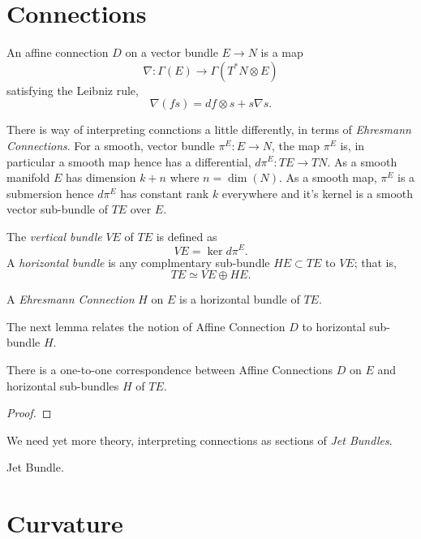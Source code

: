\documentclass{amsart}
\begin{document}
\section{Connections}

\begin{defn}
An affine connection \(D\) on a vector bundle \(E \to N\) is a map
\[
\nabla : \Gamma(E) \to \Gamma(T^{\ast} N \otimes E)
\]
satisfying the Leibniz rule,
\[
\nabla (f s) = df \otimes s + s \nabla s.
\]
\end{defn}

There is way of interpreting connctions a little differently, in terms of \emph{Ehresmann Connections}. For a smooth, vector bundle \(\pi^E : E \to N\), the map \(\pi^E\) is, in particular a smooth map hence has a differential, \(d\pi^E : TE \to TN\). As a smooth manifold \(E\) has dimension \(k+n\) where \(n = \operatorname{dim} (N)\). As a smooth map, \(\pi^E\) is a submersion hence \(d\pi^E\) has constant rank \(k\) everywhere and it's kernel is a smooth vector sub-bundle of \(TE\) over \(E\).

\begin{defn}
The \emph{vertical bundle} \(VE\) of \(TE\) is defined as
\[
VE = \operatorname{ker} d\pi^E.
\]
A \emph{horizontal bundle} is any complmentary sub-bundle \(HE \subset TE\) to \(VE\); that is,
\[
TE \simeq VE \oplus HE.
\]
\end{defn}

\begin{defn}
A \emph{Ehresmann Connection} \(H\) on \(E\) is a horizontal bundle of \(TE\).
\end{defn}

The next lemma relates the notion of Affine Connection \(D\) to horizontal sub-bundle \(H\).

\begin{lemma}
There is a one-to-one correspondence between Affine Connections \(D\) on \(E\) and horizontal sub-bundles \(H\) of \(TE\).
\end{lemma}

\begin{proof}

\end{proof}

We need yet more theory, interpreting connections as sections of \emph{Jet Bundles}.

\begin{defn}
Jet Bundle.
\end{defn}

\section{Curvature}
\end{document}
